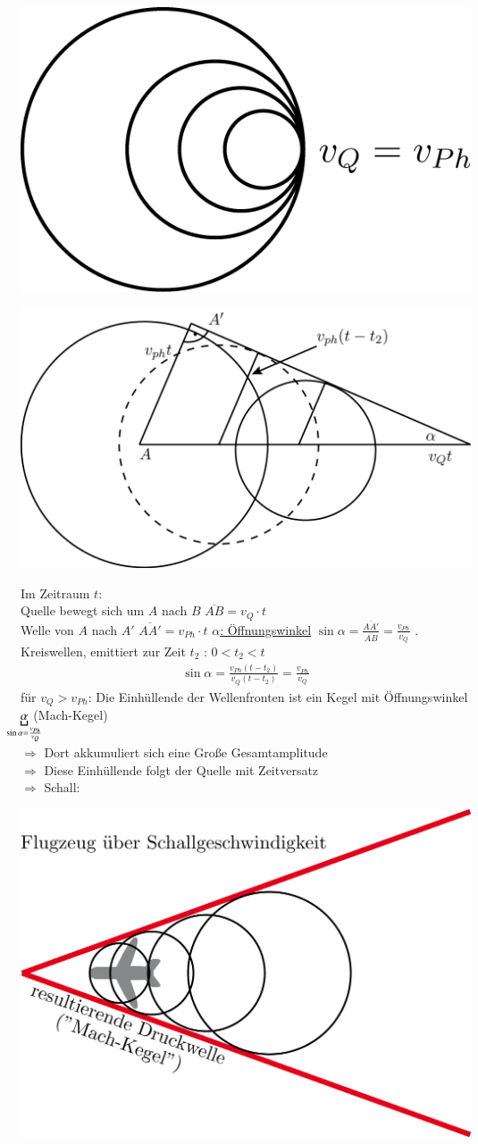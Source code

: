 \begin{center}
	\includegraphics[width=0.4\linewidth]{skizzen/19/19B31}
\end{center}
\enter
\begin{center}
	\includegraphics[width=0.5\linewidth]{skizzen/19/19B32}
\end{center}
Im Zeitraum $ t $:\\
Quelle bewegt sich um $ A $ nach $ B $ \hspace{1cm} $\overline{AB} = v_Q \cdot t$\\
Welle von $ A $ nach $ A' $ \hspace{1cm} $ \overline{AA'} = v_{Ph} \cdot t $
\enter
\underline{$ \alpha $: Öffnungswinkel} $ \sin\alpha = \frac{\overline{AA'}}{\overline{AB}} = \frac{v_{Ph}}{v_Q}$
. Kreiswellen, emittiert zur Zeit $ t_2 $ : $ 0<t_2<t $
\begin{align*}
\sin\alpha = \frac{v_{Ph} (t-t_2)}{v_Q(t-t_2)} = \frac{v_{Ph}}{v_Q}
\end{align*}
für $ v_Q>v_{Ph} $: Die Einhüllende der Wellenfronten ist ein Kegel mit Öffnungswinkel $ \underbracket{\alpha}_{\mathclap{\sin\alpha=\frac{v_{Ph}}{v_Q}}} $ (Mach-Kegel)\\
$ \Rightarrow $ Dort akkumuliert sich eine Große Gesamtamplitude \\
$ \Rightarrow $ Diese Einhüllende folgt der Quelle mit Zeitversatz\\
\enter
$ \Rightarrow $ Schall:
\begin{center}
	\includegraphics[width=0.5\linewidth]{skizzen/19/19B33}
\end{center}
